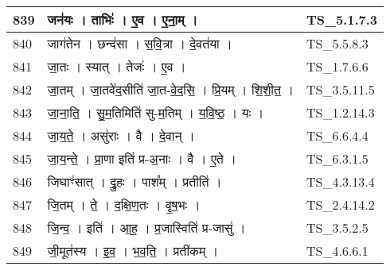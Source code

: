 \documentclass[17pt]{extarticle}
\begin{document}
\begin{longtable}{||p{0.4in}||p{4.9in}||p{0.9in}||}
    \hline
        
    839 & जन॑यः   ।   ताभिः॑   ।   ए॒व   ।   ए॒ना॒म्   ।    & TS\_5.1.7.3       \\
    
    \hline
        
    840 & जाग॑तेन   ।   छन्द॑सा   ।   स॒वि॒त्रा   ।   दे॒वत॑या   ।    & TS\_5.5.8.3       \\
    
    \hline
        
    841 & जा॒तः   ।   स्यात्   ।   तेजः॑   ।   ए॒व   ।    & TS\_1.7.6.6       \\
    
    \hline
        
    842 & जा॒तम्   ।   जा॒तवे॑द॒सीति॑ जा॒त{-}वे॒द॒सि॒   ।   प्रि॒यम्   ।   शि॒शी॒त॒   ।    & TS\_3.5.11.5       \\
    
    \hline
        
    843 & जा॒ना॒ति॒   ।   सु॒म॒तिमिति॑ सु{-}म॒तिम्   ।   य॒वि॒ष्ठ॒   ।   यः   ।    & TS\_1.2.14.3       \\
    
    \hline
        
    844 & जा॒य॒ते॒   ।   असु॑राः   ।   वै   ।   दे॒वान्   ।    & TS\_6.6.4.4       \\
    
    \hline
        
    845 & जा॒य॒न्ते॒   ।   प्रा॒णा इति॑ प्र{-}अ॒नाः   ।   वै   ।   ए॒ते   ।    & TS\_6.3.1.5       \\
    
    \hline
        
    846 & जिघाꣳ॑सात्   ।   द्रु॒हः   ।   पाश᳚म्   ।   प्रतीति॑   ।    & TS\_4.3.13.4       \\
    
    \hline
        
    847 & जि॒तम्   ।   ते॒   ।   द॒क्षि॒ण॒तः   ।   वृ॒ष॒भः   ।    & TS\_2.4.14.2       \\
    
    \hline
        
    848 & जि॒न्व॒   ।   इति॑   ।   आ॒ह॒   ।   प्र॒जास्विति॑ प्र{-}जासु॑   ।    & TS\_3.5.2.5       \\
    
    \hline
        
    849 & जी॒मूत॑स्य   ।   इ॒व॒   ।   भ॒व॒ति॒   ।   प्रती॑कम्   ।    & TS\_4.6.6.1       \\
    

\end{longtable}
\end{document}
